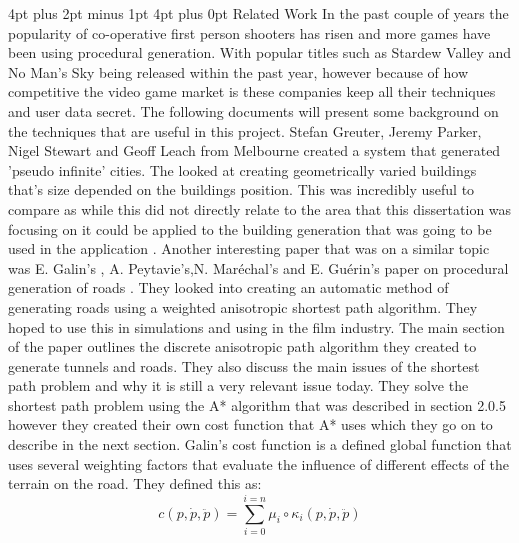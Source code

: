 \documentclass[12pt,a4paper,oneside]{book}
\makeatletter
\renewcommand\section{\@startsection {section}{1}{0mm} %
                               {4pt plus 2pt minus 1pt} %
                               {4pt plus 0pt} %
                               {\bfseries}}
\makeatother
\begin{document}
\section{Related Work}
In the past couple of years the popularity of co-operative first person shooters has risen and more games have been using procedural generation. With popular titles such as Stardew Valley and No Man's Sky being released within the past year, however because of how competitive the video game market is these companies keep all their techniques and user data secret. The following documents will present some background on the techniques that are useful in this project.
\vspace{5mm} 
\newline
Stefan Greuter, Jeremy Parker, Nigel Stewart and Geoff Leach from Melbourne created a system that generated 'pseudo infinite' cities. The looked at creating geometrically varied buildings that's size depended on the buildings position. This was incredibly useful to compare as while this did not directly relate to the area that this dissertation was focusing on it could be applied to the building generation that was going to be used in the application \cite{StefanGreut}. 
\vspace{5mm} 
\newline
Another interesting paper that was on a similar topic was E. Galin's , A. Peytavie's,N. Maréchal's and E. Guérin's paper on procedural generation of roads \cite{Roads}. They looked into creating an automatic method of generating roads using a weighted anisotropic shortest path algorithm. They hoped to use this in simulations and using in the film industry. The main section of the paper outlines the discrete anisotropic path algorithm they created to generate tunnels and roads. They also discuss the main issues of the shortest path problem and why it is still a very relevant issue today.  They solve the shortest path problem using the A* algorithm that was described in section 2.0.5 however they created their own cost function that A* uses which they go on to describe in the next section. 
\vspace{5mm} 
\newline
Galin's cost function is a defined global function that uses several weighting factors that evaluate the influence of different effects of the terrain on the road. They defined this as:  
\begin{equation}
c(p,\dot{p}, \ddot{p}) = \displaystyle\sum_{i=0}^{i=n} \mu_i\circ\kappa_i(p,\dot{p}, \ddot{p})
\end{equation} 
\end{document}
